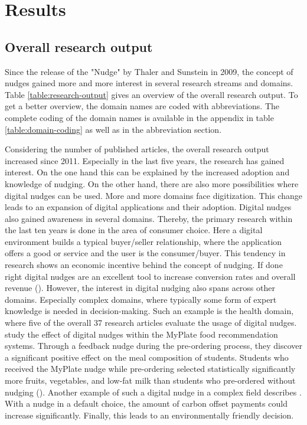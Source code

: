\section{Results}

\subsection{Overall research output}
Since the release of the "Nudge" by Thaler and Sunstein in 2009, the concept of nudges gained more and more interest in several research streams and domains. Table \ref{table:research-output} gives an overview of the overall research output. To get a better overview, the domain names are coded with abbreviations. The complete coding of the domain names is available in the appendix in table \ref{table:domain-coding} as well as in the abbreviation section.

Considering the number of published articles, the overall research output increased since 2011. Especially in the last five years, the research has gained interest. On the one hand this can be explained by the increased adoption and knowledge of nudging. On the other hand, there are also more possibilities where digital nudges can be used. More and more domains face digitization. This change leads to an expansion of digital applications and their adoption. %
Digital nudges also gained awareness in several domains. Thereby, the primary research within the last ten years is done in the area of consumer choice. Here a digital environment builds a typical buyer/seller relationship, where the application offers a good or service and the user is the consumer/buyer. This tendency in research shows an economic incentive behind the concept of nudging. If done right digital nudges are an excellent tool to increase conversion rates and overall revenue (\cite{mirsch_making_2018}).
However, the interest in digital nudging also spans across other domains. Especially complex domains, where typically some form of expert knowledge is needed in decision-making. Such an example is the health domain, where five of the overall 37 research articles evaluate the usage of digital nudges. \cite{miller_effects_2016} study the effect of digital nudges within the MyPlate food recommendation systems. Through a feedback nudge during the pre-ordering process, they discover a significant positive effect on the meal composition of students. Students who received the MyPlate nudge while pre-ordering selected statistically significantly more fruits, vegetables, and low-fat milk than students who pre-ordered without nudging (\cite{miller_effects_2016}).
Another example of such a digital nudge in a complex field describes \cite{szekely_nudging_2016}. With a nudge in a default choice, the amount of carbon offset payments could increase significantly. Finally, this leads to an environmentally friendly decision.


